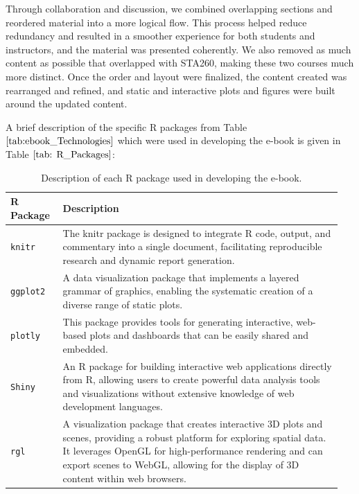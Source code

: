 \documentclass[11pt]{article}
\begin{document}
Through collaboration and discussion, we combined overlapping sections and reordered material into a more logical flow. This process helped reduce redundancy and resulted in a smoother experience for both students and instructors, and the material was presented coherently.
We also removed as much content as possible that overlapped with STA260, making these two courses much more distinct.
Once the order and layout were finalized, the content created was rearranged and refined, and static and interactive plots and figures were built around the updated content.

A brief description of the specific R packages from Table $\ref{tab:ebook_Technologies}$ which were used in developing the e-book is given in Table $\ref{tab: R_Packages}$:
\renewcommand\arraystretch{1.10}
\begin{table}[H]
\setlength{\belowcaptionskip}{-25pt}
\begin{center}
\begin{tabular}{| p{0.15\linewidth} | p{0.8\linewidth} |}
\hline
\textbf{R Package}	&	\textbf{Description}\\
\hline
\texttt{knitr}		&	The knitr package is designed to integrate R code, output, and commentary into a single document, facilitating reproducible research and dynamic report generation.\\
\hline
\texttt{ggplot2}		&	A data visualization package that implements a layered grammar of graphics, enabling the systematic creation of a diverse range of static plots.\\
\hline
\texttt{plotly}		&	This package provides tools for generating interactive, web-based plots and dashboards that can be easily shared and embedded.\\
\hline
\texttt{Shiny}		&	An R package for building interactive web applications directly from R, allowing users to create powerful data analysis tools and visualizations without extensive knowledge of web development languages.\\
\hline
\texttt{rgl}			&	A visualization package that creates interactive 3D plots and scenes, providing a robust platform for exploring spatial data. It leverages OpenGL for high-performance rendering and can export scenes to WebGL, allowing for the display of 3D content within web browsers.\\
\hline
\end{tabular}
\caption{Description of each R package used in developing the e-book.}
\label{tab:R_Packages}
\end{center}
\end{table}
\end{document}
